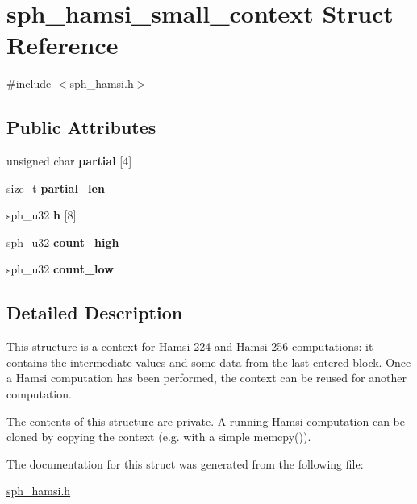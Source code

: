 \hypertarget{structsph__hamsi__small__context}{}\section{sph\+\_\+hamsi\+\_\+small\+\_\+context Struct Reference}
\label{structsph__hamsi__small__context}


{\ttfamily \#include $<$sph\+\_\+hamsi.\+h$>$}

\subsection*{Public Attributes}
\begin{DoxyCompactItemize}
\item 
\mbox{\label{structsph__hamsi__small__context_a1bd2d1a14623f0d028b8e29b8b91ef78}} 
unsigned char {\bfseries partial} \mbox{[}4\mbox{]}
\item 
\mbox{\label{structsph__hamsi__small__context_aa0df5e4f1b7d114db5f437a9fa2b8a57}} 
size\+\_\+t {\bfseries partial\+\_\+len}
\item 
\mbox{\label{structsph__hamsi__small__context_a27c6770512d8de7ba4f1dc26343faa28}} 
sph\+\_\+u32 {\bfseries h} \mbox{[}8\mbox{]}
\item 
\mbox{\label{structsph__hamsi__small__context_abde38ff81d5fcde44a2da6a33a19c828}} 
sph\+\_\+u32 {\bfseries count\+\_\+high}
\item 
\mbox{\label{structsph__hamsi__small__context_a88841f3fbb3203230a1834a5e0a8173c}} 
sph\+\_\+u32 {\bfseries count\+\_\+low}
\end{DoxyCompactItemize}


\subsection{Detailed Description}
This structure is a context for Hamsi-\/224 and Hamsi-\/256 computations\+: it contains the intermediate values and some data from the last entered block. Once a Hamsi computation has been performed, the context can be reused for another computation.

The contents of this structure are private. A running Hamsi computation can be cloned by copying the context (e.\+g. with a simple {\ttfamily memcpy()}). 

The documentation for this struct was generated from the following file\+:\begin{DoxyCompactItemize}
\item 
\mbox{\hyperlink{sph__hamsi_8h}{sph\+\_\+hamsi.\+h}}\end{DoxyCompactItemize}
